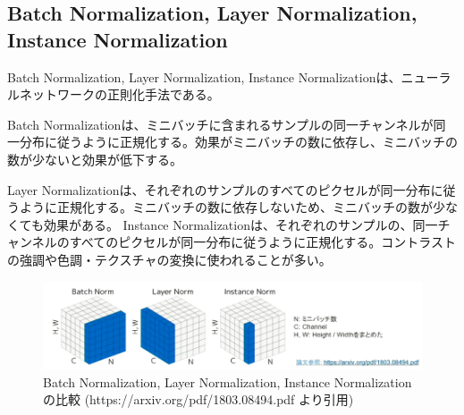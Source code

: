 \documentclass{ltjsarticle}
\begin{document}
\subsection{Batch Normalization, Layer Normalization, Instance Normalization}
Batch Normalization, Layer Normalization, Instance Normalizationは、ニューラルネットワークの正則化手法である。
\par
Batch Normalizationは、ミニバッチに含まれるサンプルの同一チャンネルが同一分布に従うように正規化する。効果がミニバッチの数に依存し、ミニバッチの数が少ないと効果が低下する。
\par
Layer Normalizationは、それぞれのサンプルのすべてのピクセルが同一分布に従うように正規化する。ミニバッチの数に依存しないため、ミニバッチの数が少なくても効果がある。
Instance Normalizationは、それぞれのサンプルの、同一チャンネルのすべてのピクセルが同一分布に従うように正規化する。コントラストの強調や色調・テクスチャの変換に使われることが多い。
\begin{figure}[htbp]
  \centering
  \includegraphics[width=15cm]{./capture/Batch_Layer_Instance_Norm.png}
  \caption{Batch Normalization, Layer Normalization, Instance Normalizationの比較 (https://arxiv.org/pdf/1803.08494.pdf より引用)}
\end{figure}
\end{document}
